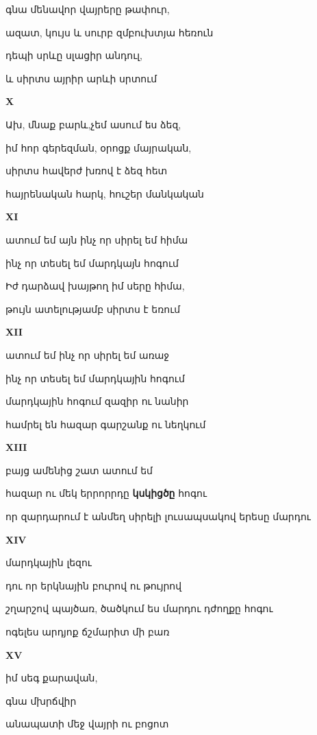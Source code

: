 գնա մենավոր վայրերը թափուր,


ազատ,  կույս  և սուրբ զմբուխտյա հեռուն


դեպի սրևը սլացիր անդուլ,


և սիրտս այրիր արևի սրտում


            
\centerline {\bf X }


Ախ, մնաք բարև,չեմ ասում ես ձեզ, 


իմ հոր գերեզման, օրոցք մայրական,


 սիրտս  հավերժ խռով է ձեզ հետ


հայրենական հարկ,  հուշեր մանկական


\centerline {\bf  XI}

ատում եմ այն ինչ որ սիրել եմ հիմա


ինչ որ տեսել եմ  մարդկայն հոգում


Իժ դարձավ խայթող իմ սերը հիմա,

  թույն ատելությամբ  սիրտս է եռում

\centerline{\bf XII}

ատում եմ ինչ որ սիրել եմ առաջ


ինչ որ տեսել եմ մարդկային հոգում

մարդկային հոգում զազիր ու նանիր 


համրել են հազար գարշանք ու նեղկում  

            \centerline{\bf  XIII  }



բայց ամենից շատ ատում եմ 


հազար ու մեկ երրորրդը {\bf կսկիցծը } հոգու


որ զարդարում է անմեղ սիրելի լուսապսակով  երեսը մարդու




\centerline{\bf XIV}

մարդկային լեզու



դու  որ երկնային բուրով ու թույրով


շղարշով պայծառ,  ծածկում ես մարդու դժողքը հոգու



ոգելես արդյոք ճշմարիտ մի բառ



\centerline {\bf XV}



իմ սեգ քարավան,


գնա մխրճվիր 

անապատի մեջ վայրի ու բոցոտ


